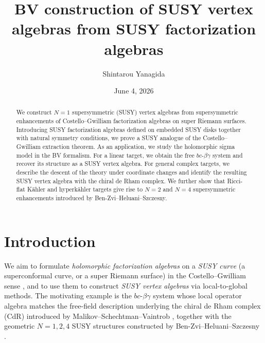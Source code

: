 \documentclass[final,reqno]{amsart}
\numberwithin{equation}{section}
\theoremstyle{definition}
\begin{document}
\title{BV construction of SUSY vertex algebras from SUSY factorization algebras}
\author{Shintarou Yanagida}
\address{Graduate School of Mathematics, Nagoya University.
 Furocho, Chikusaku, Nagoya, Japan, 464-8602.}
\date{June 4, 2026}

\begin{abstract}
We construct $N=1$ supersymmetric (SUSY) vertex algebras from 
supersymmetric enhancements of Costello--Gwilliam factorization algebras 
on super Riemann surfaces.
Introducing SUSY factorization algebras defined on embedded SUSY disks 
together with natural symmetry conditions,
we prove a SUSY analogue of the Costello--Gwilliam extraction theorem.
%
As an application, we study the holomorphic sigma model in the BV formalism.
For a linear target, we obtain the free $bc$-$\beta\gamma$ system 
and recover its structure as a SUSY vertex algebra. 
For general complex targets, we describe the descent of the theory 
under coordinate changes and identify the resulting SUSY vertex algebra 
with the chiral de Rham complex. 
We further show that Ricci-flat K\"ahler and hyperk\"ahler targets 
give rise to $N=2$ and $N=4$ supersymmetric enhancements 
introduced by Ben-Zvi--Heluani--Szczesny.
\end{abstract}

\maketitle
{\small \tableofcontents}

\setcounter{section}{-1}
\section{Introduction}

We aim to formulate \emph{holomorphic factorization algebras} 
on a \emph{SUSY curve} (a superconformal curve, or a super Riemann surface)
in the Costello--Gwilliam sense \cite{CG1,CG2}, 
and to use them to construct \emph{SUSY vertex algebras} \cite{HK}
via local-to-global methods. 
The motivating example is the $bc$-$\beta\gamma$ system 
whose local operator algebra matches the free-field description 
underlying the chiral de Rham complex (CdR) 
introduced by Malikov--Schechtman--Vaintrob \cite{MSV},
together with the geometric $N{=}1,2,4$ SUSY structures constructed by
Ben-Zvi--Heluani--Szczesny \cite{BHS}.
\end{document}
